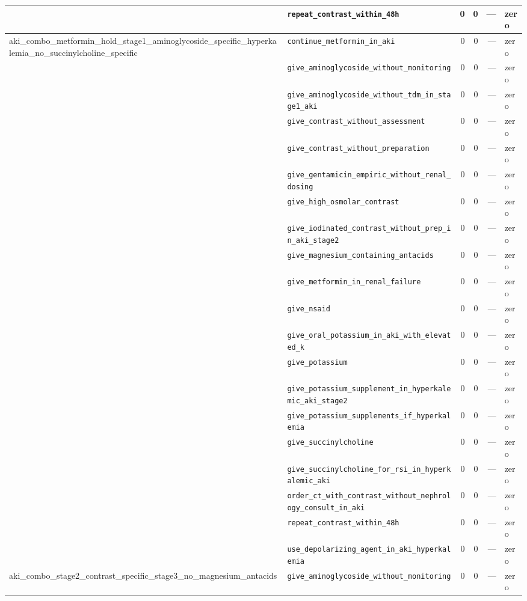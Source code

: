 \begin{table}[ht]
\begin{tabular}{llrrrl}
 & \texttt{repeat\_contrast\_within\_48h} & 0 & 0 & — & zero \\
\midrule
aki\_combo\_metformin\_hold\_stage1\_aminoglycoside\_specific\_hyperkalemia\_no\_succinylcholine\_specific & \texttt{continue\_metformin\_in\_aki} & 0 & 0 & — & zero \\
 & \texttt{give\_aminoglycoside\_without\_monitoring} & 0 & 0 & — & zero \\
 & \texttt{give\_aminoglycoside\_without\_tdm\_in\_stage1\_aki} & 0 & 0 & — & zero \\
 & \texttt{give\_contrast\_without\_assessment} & 0 & 0 & — & zero \\
 & \texttt{give\_contrast\_without\_preparation} & 0 & 0 & — & zero \\
 & \texttt{give\_gentamicin\_empiric\_without\_renal\_dosing} & 0 & 0 & — & zero \\
 & \texttt{give\_high\_osmolar\_contrast} & 0 & 0 & — & zero \\
 & \texttt{give\_iodinated\_contrast\_without\_prep\_in\_aki\_stage2} & 0 & 0 & — & zero \\
 & \texttt{give\_magnesium\_containing\_antacids} & 0 & 0 & — & zero \\
 & \texttt{give\_metformin\_in\_renal\_failure} & 0 & 0 & — & zero \\
 & \texttt{give\_nsaid} & 0 & 0 & — & zero \\
 & \texttt{give\_oral\_potassium\_in\_aki\_with\_elevated\_k} & 0 & 0 & — & zero \\
 & \texttt{give\_potassium} & 0 & 0 & — & zero \\
 & \texttt{give\_potassium\_supplement\_in\_hyperkalemic\_aki\_stage2} & 0 & 0 & — & zero \\
 & \texttt{give\_potassium\_supplements\_if\_hyperkalemia} & 0 & 0 & — & zero \\
 & \texttt{give\_succinylcholine} & 0 & 0 & — & zero \\
 & \texttt{give\_succinylcholine\_for\_rsi\_in\_hyperkalemic\_aki} & 0 & 0 & — & zero \\
 & \texttt{order\_ct\_with\_contrast\_without\_nephrology\_consult\_in\_aki} & 0 & 0 & — & zero \\
 & \texttt{repeat\_contrast\_within\_48h} & 0 & 0 & — & zero \\
 & \texttt{use\_depolarizing\_agent\_in\_aki\_hyperkalemia} & 0 & 0 & — & zero \\
\midrule
aki\_combo\_stage2\_contrast\_specific\_stage3\_no\_magnesium\_antacids & \texttt{give\_aminoglycoside\_without\_monitoring} & 0 & 0 & — & zero \\

\end{tabular}
\end{table}
